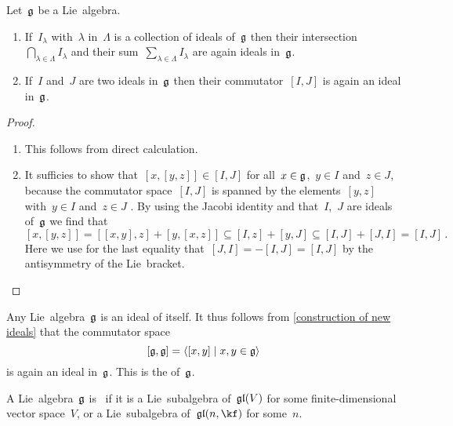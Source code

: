 \begin{proposition}
  \label{construction of new ideals}
  Let~$\mathfrak{g}$ be a Lie~algebra.
  \begin{enumerate}
    \item
    If~$I_\lambda$ with~$\lambda$ in~$\Lambda$ is a collection of ideals of~$\mathfrak{g}$ then their intersection~$\bigcap_{\lambda \in \Lambda} I_\lambda$ and their sum~$\sum_{\lambda \in \Lambda} I_\lambda$ are again ideals in~$\mathfrak{g}$.
    \item
    If~$I$ and~$J$ are two ideals in~$\mathfrak{g}$ then their commutator~$[I,J]$ is again an ideal in~$\mathfrak{g}$.
  \end{enumerate}
\end{proposition}


\begin{proof}
  \leavevmode
  \begin{enumerate}
    \item
      This follows from direct calculation.
    \item
      It sufficies to show that~$[x,[y,z]] \in [I,J]$ for all~$x \in \mathfrak{g}$,~$y \in I$ and~$z \in J$, because the commutator space~$[I,J]$ is spanned by the elements~$[y,z]$ with~$y \in I$ and~$z \in J$ .
      By using the Jacobi identity and that~$I$,~$J$ are ideals of~$\mathfrak{g}$ we find that
      \[
        [x,[y,z]]
        =
        [[x,y], z] + [y, [x,z]]
        \subseteq
        [I, z] + [y, J]
        \subseteq
        [I, J] + [J, I]
        =
        [I,J] \,.
      \]
      Here we use for the last equality that~$[J,I] = -[I,J] = [I,J]$ by the antisymmetry of the Lie~bracket.
   \qedhere
 \end{enumerate}
\end{proof}


\begin{example}
  Any Lie~algebra~$\mathfrak{g}$ is an ideal of itself.
  It thus follows from \cref{construction of new ideals} that the commutator space
  \[
    [\glie, \glie]
    =
    \gen{ [x,y] \suchthat x, y \in \glie }
  \]
  is again an ideal in~$\mathfrak{g}$.
  This is the  of~$\mathfrak{g}$.
\end{example}


\begin{definition}
  A Lie~algebra~$\mathfrak{g}$ is~ if it is a Lie~subalgebra of~$\mathfrak{gl}(V)$ for some finite-dimensional vector space~$V$, or a Lie~subalgebra of~$\gllie(n, \kf)$ for some~$n$.
\end{definition}


